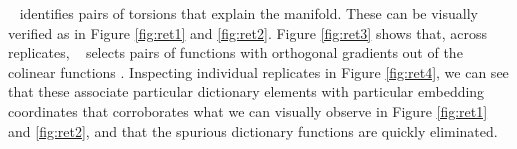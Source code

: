 {%


\ouralg~ identifies pairs of torsions that explain the manifold. These can be visually verified as in Figure \ref{fig:ret1} and \ref{fig:ret2}.  Figure \ref{fig:ret3} shows that, across replicates, \ouralg~ selects pairs of functions with orthogonal gradients out of the colinear functions  . Inspecting individual replicates in Figure \ref{fig:ret4}, we can see that these associate particular dictionary elements with particular embedding coordinates that corroborates what we can visually observe in Figure \ref{fig:ret1} and \ref{fig:ret2}, and that the spurious dictionary functions are quickly eliminated.   

}
